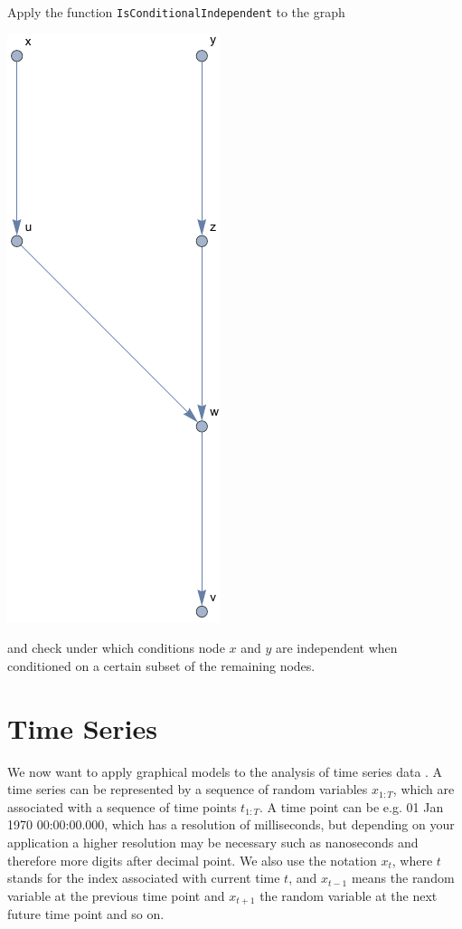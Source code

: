 \documentclass{tstextbook}
\begin{document}
\begin{exercise}
Apply the function \texttt{IsConditionalIndependent} to the graph

\includegraphics[scale=0.8, center]{images/complex_graph.pdf}

and check under which conditions node $x$ and $y$ are independent when conditioned on a certain subset of the remaining nodes.
\end{exercise}

\section{Time Series}
We now want to apply graphical models to the analysis of time series data \cite{barber2010}. A time series can be represented by a sequence of random variables $x_{1:T}$, which are associated with a sequence of time points $t_{1:T}$. A time point can be e.g. 01 Jan 1970 00:00:00.000, which has a resolution of milliseconds, but depending on your application a higher resolution may be necessary such as nanoseconds and therefore more digits after decimal point. We also use the notation $x_t$, where $t$ stands for the index associated with current time $t$, and $x_{t-1}$ means the random variable at the previous time point and $x_{t+1}$ the random variable at the next future time point and so on.\\
\end{document}
